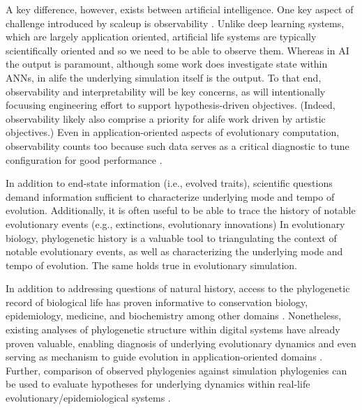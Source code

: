 A key difference, however, exists between artificial intelligence.
One key aspect of challenge introduced by scaleup is observability \citep{DOEDATAREDUCTIONPHAMPHLET}.
Unlike deep learning systems, which are largely application oriented, artificial life systems are typically scientifically oriented and so we need to be able to observe them.
Whereas in AI the output is paramount, although some work does investigate state within ANNs, in alife the underlying simulation itself is the output.
To that end, observability \citep{moreno2023toward} and interpretability \citep{horgan1995complexity} will be key concerns, as will intentionally focuusing engineering effort to support hypothesis-driven objectives.
(Indeed, observability likely also comprise a priority for alife work driven by artistic objectives.)
Even in application-oriented aspects of evolutionary computation, observability counts too because such data serves as a critical diagnostic to tune configuration for good performance \citep{hernandez2022can}.

In addition to end-state information (i.e., evolved traits), scientific questions demand information sufficient to characterize underlying mode and tempo of evolution.
Additionally, it is often useful to be able to trace the history of notable evolutionary events (e.g., extinctions, evolutionary innovations)
In evolutionary biology, phylogenetic history is a valuable tool to triangulating the context of notable evolutionary events, as well as characterizing the underlying mode and tempo of evolution.
The same holds true in evolutionary simulation.

In addition to addressing questions of natural history, access to the phylogenetic record of biological life has proven informative to conservation biology, epidemiology, medicine, and biochemistry among other domains \citep{faithConservationEvaluationPhylogenetic1992, STAMATAKIS2005phylogenetics, frenchHostPhylogenyShapes2023,kim2006discovery}.
Nonetheless, existing analyses of phylogenetic structure within digital systems have already proven valuable, enabling diagnosis of underlying evolutionary dynamics \citep{moreno2023toward,hernandez2022can,shahbandegan2022untangling, lewinsohnStatedependentEvolutionaryModels2023a} and even serving as mechanism to guide evolution in application-oriented domains \citep{lalejini2024phylogeny,lalejini2024runtime,murphy2008simple,burke2003increased}.
Further, comparison of observed phylogenies against simulation phylogenies can be used to evaluate hypotheses for underlying dynamics within real-life evolutionary/epidemiological systems \citep{giardina2017inference,voznica2022deep}.

